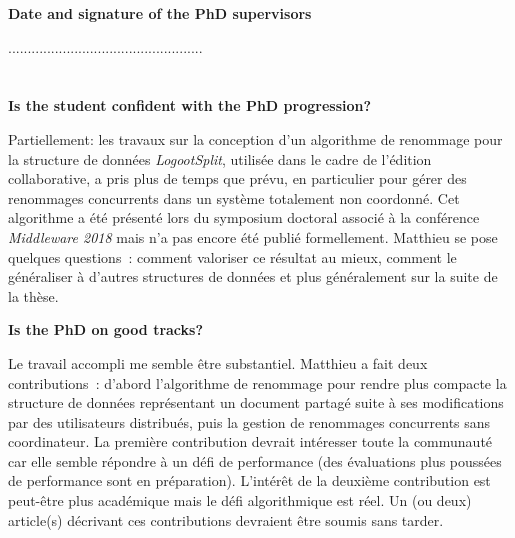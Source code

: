 \documentclass[12pt]{article}
\newcommand{\commentaire}[1]{}
\begin{document}
\noindent\textbf{Date and signature of the PhD supervisors}

..................................................

\newpage
\section*{}

\commentaire{%
  \textcolor{red}{The questions below are suggestions. For each
    section, the report can be as short as “Yes” or more detailed
    according to the feeling of the CSI.\\}}

\noindent\textbf{Is the student confident with the PhD progression?}
\commentaire{%
  E.g.: How does the PhD student view the progress of
  her/his thesis? How often does the student meet with her/his
  supervisors? How is the student’s relationship with her/his
  supervisors? In case of problems, does the student know who to
  discuss these issues with?\\}

Partiellement: les travaux sur la conception d'un algorithme de renommage pour la
structure de données \emph{LogootSplit}, utilisée dans le cadre de l'édition
collaborative, a pris plus de temps que prévu, en particulier pour gérer des
renommages concurrents dans un système totalement non coordonné. Cet algorithme
a été présenté lors du symposium doctoral associé à la conférence
\emph{Middleware 2018} mais n'a pas encore été publié formellement. Matthieu se
pose quelques questions~: comment valoriser ce résultat au mieux, comment le
généraliser à d'autres structures de données et plus généralement sur la suite
de la thèse.

\medskip
\noindent\textbf{Is the PhD on good tracks?}
\commentaire{%
  E.g: Is the student comfortable with his/her thesis topic? Did
  she/he embraced the subject? Do you have any comments or advice
  concerning publications? Does the student have opportunities to
  present her/his work? Do you have noteworthy concerns about the
  progression of the thesis?\\}

Le travail accompli me semble être substantiel. Matthieu a fait deux
contributions~: d'abord l'algorithme de renommage pour rendre plus compacte la
structure de données représentant un document partagé suite à ses modifications
par des utilisateurs distribués, puis la gestion de renommages concurrents sans
coordinateur. La première contribution devrait intéresser toute la communauté
car elle semble répondre à un défi de performance (des évaluations plus poussées
de performance sont en préparation). L'intérêt de la deuxième contribution est
peut-être plus académique mais le défi algorithmique est réel. Un (ou deux)
article(s) décrivant ces contributions devraient être soumis sans tarder.
\end{document}
